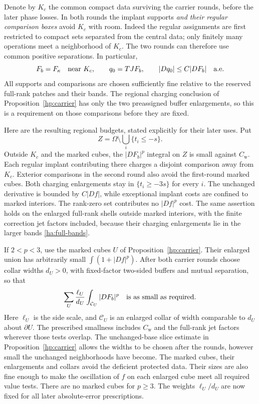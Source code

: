 Denote by $K_c$ the common compact data surviving the carrier rounds,
before the later phase losses.  In both rounds the implant supports
\emph{and their regular comparison boxes} avoid $K_c$ with room.
Indeed the regular assignments are first restricted to compact sets
separated from the central data; only finitely many operations meet
a neighborhood of $K_c$.  The two rounds can therefore use common
positive separations.  In particular,
\begin{equation}\label{ha:q0-weak}
 F_b=F_\kappa\quad\hbox{near }K_c,
 \qquad q_0=TJF_b,
 \qquad |Dq_0|\le C|DF_b|\quad\hbox{a.e.}
\end{equation}
All supports and comparisons are chosen sufficiently fine relative
to the reserved full-rank patches and their bands.  The regional
charging conclusion of Proposition~\ref{hp:carrier} has only the two
preassigned buffer enlargements, so this is a requirement on those
comparisons before they are fixed.

Here are the resulting regional budgets, stated explicitly for their
later uses.  Put
\[
                     Z=\Omega\setminus\bigcup_i\{t_i\le-s\}.
\]
Outside $K_c$ and the marked cubes, the $|DF_b|^p$ integral on $Z$ is
small against $C_{\mathrm w}$.  Each regular implant contributing
there charges a disjoint comparison away from $K_c$.  Exterior
comparisons in the second round also avoid the first-round marked
cubes.  Both charging enlargements stay in $\{t_i\ge-3s\}$ for every
$i$.  The unchanged derivative is bounded by $C|Df|$, while exceptional
implant costs are confined to marked interiors.  The rank-zero set
contributes no $|Df|^p$ cost.  The same assertion holds on the enlarged
full-rank shells outside marked interiors, with the finite correction
jet factors included, because their charging enlargements lie in the
larger bands \eqref{ha:full-bands}.

If $2<p<3$, use the marked cubes $U$ of
Proposition~\ref{hp:carrier}.  Their enlarged union has arbitrarily
small $\int(1+|Df|^p)$.  After both carrier rounds choose collar widths
$d_U>0$, with fixed-factor two-sided buffers and mutual separation,
so that
\begin{equation}\label{ha:collar-budget}
 \sum_U\frac{\ell_U}{d_U}
             \int_{\mathcal C_U}|DF_b|^p
                  \quad\hbox{is as small as required}.
\end{equation}
Here $\ell_U$ is the side scale, and $\mathcal C_U$ is an enlarged
collar of width comparable to $d_U$ about $\partial U$.
The prescribed smallness includes $C_{\mathrm w}$ and the full-rank
jet factors wherever those tests overlap.  The unchanged-base slice
estimate in Proposition~\ref{hp:carrier} allows the widths to be
chosen after the rounds, however small the unchanged neighborhoods
have become.  The marked cubes, their enlargements and collars avoid
the deficient protected data.  Their sizes are also fine enough to
make the oscillation of $f$ on each enlarged cube meet all required
value tests.  There are no marked cubes for $p\ge3$.  The weights
$\ell_U/d_U$ are now fixed for all later absolute-error prescriptions.

